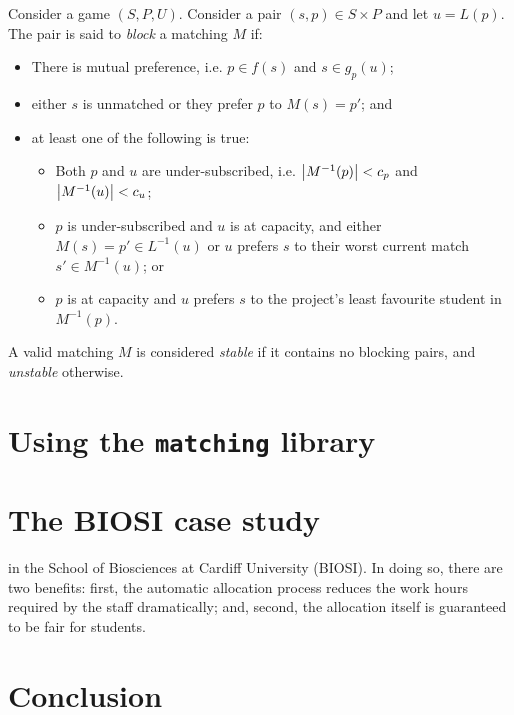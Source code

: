 \begin{definition}\label{def:sa_blocking}
    Consider a game \((S, P, U)\). Consider a pair \((s, p) \in S \times P\) and
    let \(u = L(p)\). The pair is said to \emph{block} a matching \(M\) if:

    \begin{itemize}
        \item There is mutual preference, i.e. \(p \in f(s)\) and \(s \in
            g_p(u)\);
        \item either \(s\) is unmatched or they prefer \(p\) to \(M(s) = p'\);
            and
        \item at least one of the following is true:
            \begin{itemize}
                \item Both \(p\) and \(u\) are under-subscribed, i.e.
                    \(\abs*{M^{-1}(p)} < c_p\) and \(\abs*{M^{-1}(u)} < c_u\);
                \item \(p\) is under-subscribed and \(u\) is at capacity, and
                    either \(M(s) = p' \in L^{-1}(u)\) or \(u\) prefers \(s\) to
                    their worst current match \(s' \in M^{-1}(u)\); or
                \item \(p\) is at capacity and \(u\) prefers \(s\) to the
                    project's least favourite student in \(M^{-1}(p)\).
            \end{itemize}
    \end{itemize}

    A valid matching \(M\) is considered \emph{stable} if it contains no
    blocking pairs, and \emph{unstable} otherwise.
\end{definition}


\section{Using the {\color{grey}\texttt{matching}} library}
\label{sec:matching}



\section{The BIOSI case study}\label{sec:biosi}

in the School of Biosciences at Cardiff University (BIOSI). In doing
so, there are two benefits: first, the automatic allocation process reduces the
work hours required by the staff dramatically; and, second, the allocation
itself is guaranteed to be fair for students.


\section{Conclusion}\label{sec:conclusion}
